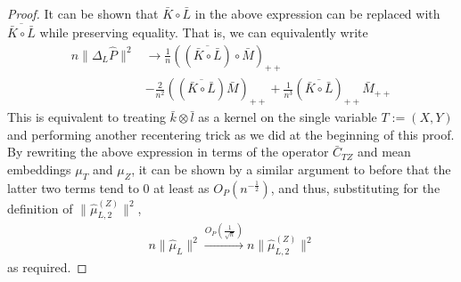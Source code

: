 \documentclass[]{article}
\begin{document}
\begin{proof}
It can be shown that $\bar{K}\circ \bar{L}$ in the above expression can be replaced with $\overline{\bar{K}\circ \bar{L}}$ while preserving equality. That is, we can equivalently write
\begin{align*}
n\|\Delta_L \hat{P}\|^2 & \longrightarrow \frac{1}{n}((\overline{\bar{K}\circ \bar{L}}) \circ \bar{M})_{++}\\& - \frac{2}{n^2}((\overline{\bar{K}\circ \bar{L}})\bar{M})_{++} + \frac{1}{n^3}(\overline{\bar{K}\circ \bar{L}})_{++}\bar{M}_{++}
\end{align*}
This is equivalent to treating $\bar{k}\otimes\bar{l}$ as a kernel on the single variable $T:=(X,Y)$ and performing another recentering trick as we did at the beginning of this proof. By rewriting the above expression in terms of the operator $\bar{C}_{TZ}$ and mean embeddings $\mu_T$ and $\mu_Z$, it can be shown by a similar argument to before that the latter two terms tend to 0 at least as $O_P(n^{-\frac{1}{2}})$, and thus, substituting for the definition of $\|\hat \mu^{(Z)}_{L,2} \|^2$,
\begin{align*}
 n \|\hat \mu_{L} \|^2 \xrightarrow{O_P(\frac{1}{\sqrt{n}})} n \|\hat \mu^{(Z)}_{L,2} \|^2
\end{align*} as required.


\end{proof}
\end{document}
